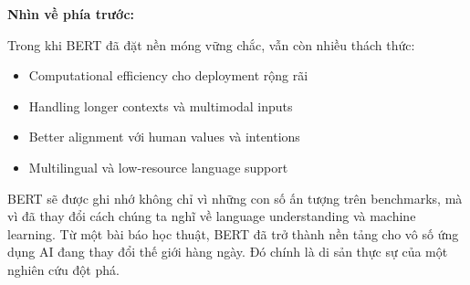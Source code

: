 \textbf{Nhìn về phía trước:}

Trong khi BERT đã đặt nền móng vững chắc, vẫn còn nhiều thách thức:
\begin{itemize}
    \item Computational efficiency cho deployment rộng rãi
    \item Handling longer contexts và multimodal inputs
    \item Better alignment với human values và intentions
    \item Multilingual và low-resource language support
\end{itemize}

BERT sẽ được ghi nhớ không chỉ vì những con số ấn tượng trên benchmarks, mà vì đã thay đổi cách chúng ta nghĩ về language understanding và machine learning. Từ một bài báo học thuật, BERT đã trở thành nền tảng cho vô số ứng dụng AI đang thay đổi thế giới hàng ngày. Đó chính là di sản thực sự của một nghiên cứu đột phá.
